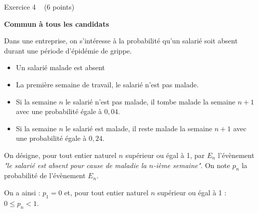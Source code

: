 
%
\begin{h3}Exercice 4   (6 points)\end{h3}
\textbf{Commun  à tous les candidats}
\par
Dans une entreprise, on s'intéresse à la probabilité qu'un salarié soit absent durant une période d'épidémie de grippe.
\begin{itemize}
     \item
     Un salarié malade est absent
     \item
     La première semaine de travail, le salarié n'est pas malade.
     \item
     Si la semaine $n$ le salarié n'est pas malade, il tombe malade la semaine $n+1$ avec une probabilité égale à $0,04$.
     \item
     Si la semaine $n$ le salarié est malade, il reste malade la semaine $n+1$ avec une probabilité égale à $0,24$.
\end{itemize}
On désigne, pour tout entier naturel $n$ supérieur ou égal à 1, par $E_{n}$ l'évènement \textit{"le salarié est absent pour cause de maladie la $n$-ième semaine"}. On note $p_{n}$ la probabilité de l'évènement $E_{n}$.
\par
On a ainsi : $p_{1}=0$ et, pour tout entier naturel $n$ supérieur ou égal à 1 : $0\leqslant  p_{n} < 1$.

